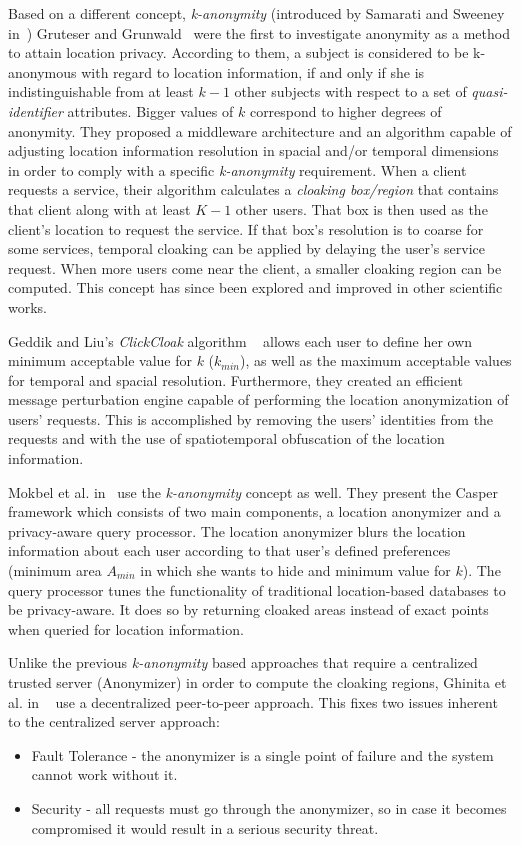 Based on a different concept, \emph{k-anonymity} (introduced by
Samarati and Sweeney in~\cite{samarati1998protecting}) Gruteser and
Grunwald~\cite{gruteser2003anonymous} were the first to investigate
anonymity as a method to attain location privacy. According to them, a
subject is considered to be k-anonymous with regard to location
information, if and only if she is indistinguishable from at least
$k-1$ other subjects with respect to a set of
\emph{quasi-identifier} attributes. Bigger values of $k$ correspond to higher degrees of
anonymity. They proposed a middleware architecture and an algorithm
capable of adjusting location information resolution in spacial and/or
temporal dimensions in order to comply with a specific
\emph{k-anonymity} requirement. When a client requests a service,
their algorithm calculates a \emph{cloaking box/region} that contains
that client along with at least $K-1$ other users. That box is then
used as the client's location to request the service. If that box's
resolution is to coarse for some services, temporal cloaking can be
applied by delaying the user's service request. When more users come
near the client, a smaller cloaking region can be computed. This concept
has since been explored and improved in other scientific works.

Geddik and Liu's
\emph{ClickCloak} algorithm
~\cite{gedik2005location,gedik2008protecting} allows each user to
define her own minimum acceptable value for $k$ ($k_{min}$), as well
as the maximum acceptable values for temporal and spacial resolution.
Furthermore, they created an efficient message perturbation engine
capable of performing the location anonymization of users' requests.
This is accomplished by removing the users' identities from the
requests and with the use of spatiotemporal obfuscation of the
location information. 

Mokbel et al. in~\cite{mokbel2006new} use the \emph{k-anonymity} concept as well.
They present the Casper framework which consists of two main
components, a location anonymizer and a privacy-aware query processor.
The location anonymizer blurs the location information about each user
according to that user's defined preferences (minimum area $A_{min}$
in which she wants to hide and minimum value for $k$). The query
processor tunes the functionality of traditional location-based
databases to be privacy-aware. It does so by returning cloaked areas
instead of exact points when queried for location information.

Unlike the previous \emph{k-anonymity} based approaches that require a
centralized trusted server (Anonymizer) in order to compute the cloaking
regions, Ghinita et al. in ~\cite{ghinita2007prive} use a
decentralized peer-to-peer approach. This fixes two issues inherent to
the centralized server approach: 
\begin{itemize}
\item Fault Tolerance -  the
anonymizer is a single point of failure and the system cannot work
without it.
\item Security - all requests must go through the anonymizer, so in
  case it becomes compromised it would result in a serious security
  threat.
\end{itemize}

